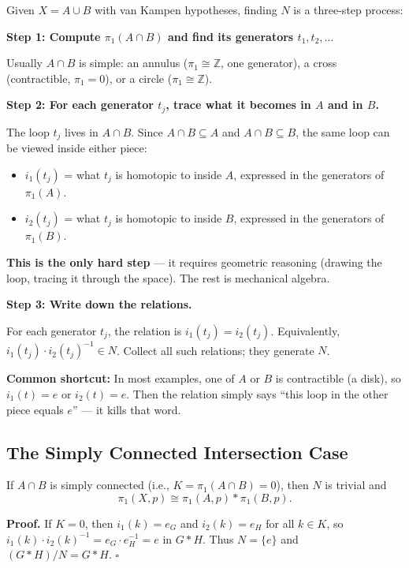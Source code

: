 \documentclass[11pt]{report}
\renewenvironment{proof}[1][Proof]{\noindent\textbf{#1.} }{\hfill$\square$\par\vspace{5pt}}
\begin{document}
\begin{rembox}
Given $X = A \cup B$ with van Kampen hypotheses, finding $N$ is a three-step process:

\textbf{Step 1: Compute $\pi_1(A \cap B)$ and find its generators $t_1, t_2, \ldots$}

Usually $A \cap B$ is simple: an annulus ($\pi_1 \cong \mathbb{Z}$, one generator), a cross (contractible, $\pi_1 = 0$), or a circle ($\pi_1 \cong \mathbb{Z}$).

\textbf{Step 2: For each generator $t_j$, trace what it becomes in $A$ and in $B$.}

The loop $t_j$ lives in $A \cap B$. Since $A \cap B \subseteq A$ and $A \cap B \subseteq B$, the same loop can be viewed inside either piece:
\begin{itemize}[nosep]
    \item $i_1(t_j)$ = what $t_j$ is homotopic to inside $A$, expressed in the generators of $\pi_1(A)$.
    \item $i_2(t_j)$ = what $t_j$ is homotopic to inside $B$, expressed in the generators of $\pi_1(B)$.
\end{itemize}
\textbf{This is the only hard step} --- it requires geometric reasoning (drawing the loop, tracing it through the space). The rest is mechanical algebra.

\textbf{Step 3: Write down the relations.}

For each generator $t_j$, the relation is $i_1(t_j) = i_2(t_j)$. Equivalently, $i_1(t_j) \cdot i_2(t_j)^{-1} \in N$. Collect all such relations; they generate $N$.

\textbf{Common shortcut:} In most examples, one of $A$ or $B$ is contractible (a disk), so $i_1(t) = e$ or $i_2(t) = e$. Then the relation simply says ``this loop in the other piece equals $e$'' --- it kills that word.
\end{rembox}

\subsection{The Simply Connected Intersection Case}

\begin{corbox}
If $A \cap B$ is simply connected (i.e., $K = \pi_1(A \cap B) = 0$), then $N$ is trivial and
\[\pi_1(X, p) \cong \pi_1(A, p) * \pi_1(B, p).\]
\end{corbox}

\begin{proof}
If $K = 0$, then $i_1(k) = e_G$ and $i_2(k) = e_H$ for all $k \in K$, so $i_1(k) \cdot i_2(k)^{-1} = e_G \cdot e_H^{-1} = e$ in $G * H$. Thus $N = \{e\}$ and $(G * H)/N = G * H$.
\end{proof}
\end{document}

